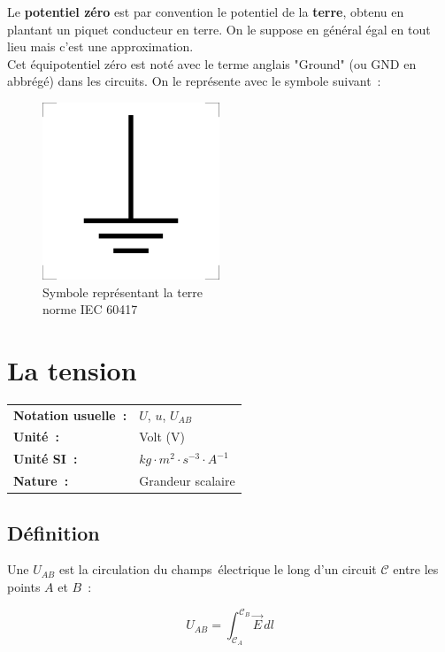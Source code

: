 Le \textbf{potentiel zéro} est par convention le potentiel de la \textbf{terre}, obtenu en plantant un piquet conducteur en terre. On le suppose en général égal en tout lieu mais c'est une approximation. \\

Cet équipotentiel zéro est noté avec le terme anglais "Ground" (ou GND en abbrégé) dans les circuits. On le représente avec le symbole suivant~:

\begin{figure}[!h]
\centering
\includegraphics{part01/chap01/ground.png}
	\caption{Symbole représentant la terre \\ norme IEC 60417 }
\end{figure}


\section{La tension}

\begin{tabular}{ll}
\textbf{Notation usuelle~:} & $U$, $u$, $U_{AB}$ \\
\textbf{Unité~:} & Volt (V) \\
\textbf{Unité SI~:} & ${kg} \cdot m^2 \cdot {s}^{-3} \cdot A^{-1}$ \\
\textbf{Nature~:} & Grandeur scalaire \\
\end{tabular} 

\subsection*{Définition}

Une  $U_{AB}$ est la circulation du champs électrique le long d'un circuit $\mathscr{C}$ entre les points $A$ et $B$~:

\begin{equation}
	U_{AB} = \int_{\mathscr{C}_{A}}^{\mathscr{C}_B}\vec{E}\,dl
\end{equation}

